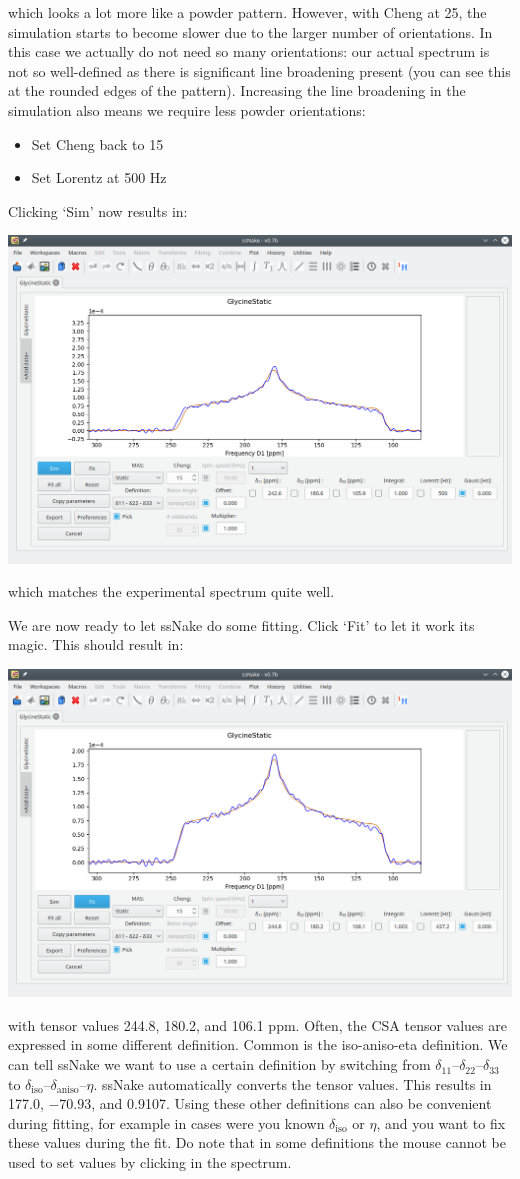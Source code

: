 \documentclass[11pt,a4paper]{article}
\begin{document}
which looks a lot more like a powder pattern.
However, with Cheng at 25, the simulation starts to become slower due to the larger number of orientations.
In this case we actually do not need so many orientations: our actual spectrum is not so well-defined as there is significant line broadening present (you can see this at the rounded edges of the pattern).
Increasing the line broadening in the simulation also means we require less powder orientations:
\begin{itemize}
  \item Set Cheng back to 15
  \item Set Lorentz at 500 Hz
\end{itemize}
Clicking `Sim' now results in:
\begin{center}
\includegraphics[width=0.8\linewidth]{Figs/Fig5.png}
\end{center}
which matches the experimental spectrum quite well.

We are now ready to let ssNake do some fitting.
Click `Fit' to let it work its magic.
This should result in:
\begin{center}
\includegraphics[width=0.8\linewidth]{Figs/Fig6.png}
\end{center}
with tensor values 244.8, 180.2, and 106.1 ppm.
Often, the CSA tensor values are expressed in some different definition.
Common is the iso-aniso-eta definition.
We can tell ssNake we want to use a certain definition by switching from $\delta_{11}$--$\delta_{22}$--$\delta_{33}$ to $\delta_\text{iso}$--$\delta_\text{aniso}$--$\eta$.
ssNake automatically converts the tensor values.
This results in 177.0, $-70.93$, and 0.9107.
Using these other definitions can also be convenient during fitting, for example in cases were you known $\delta_\text{iso}$ or $\eta$, and you want to fix these values during the fit.
Do note that in some definitions the mouse cannot be used to set values by clicking in the spectrum.
\end{document}
